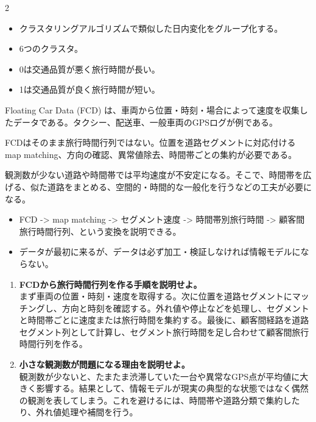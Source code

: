 \clearpage
{}
\begin{multicols}{2}\footnotesize\raggedcolumns
{}
\begin{itemize}
\item クラスタリングアルゴリズムで類似した日内変化をグループ化する。
\item 6つのクラスタ。
\item 0は交通品質が悪く旅行時間が長い。
\item 1は交通品質が良く旅行時間が短い。
\end{itemize}
Floating Car Data (FCD) は、車両から位置・時刻・場合によって速度を収集したデータである。タクシー、配送車、一般車両のGPSログが例である。\par

FCDはそのまま旅行時間行列ではない。位置を道路セグメントに対応付ける map matching、方向の確認、異常値除去、時間帯ごとの集約が必要である。\par

観測数が少ない道路や時間帯では平均速度が不安定になる。そこで、時間帯を広げる、似た道路をまとめる、空間的・時間的な一般化を行うなどの工夫が必要になる。\par
{}
\begin{itemize}
\item FCD -> map matching -> セグメント速度 -> 時間帯別旅行時間 -> 顧客間旅行時間行列、という変換を説明できる。
\item データが最初に来るが、データは必ず加工・検証しなければ情報モデルにならない。
\end{itemize}
\begin{enumerate}
\item \textbf{FCDから旅行時間行列を作る手順を説明せよ。}\\まず車両の位置・時刻・速度を取得する。次に位置を道路セグメントにマッチングし、方向と時刻を確認する。外れ値や停止などを処理し、セグメントと時間帯ごとに速度または旅行時間を集約する。最後に、顧客間経路を道路セグメント列として計算し、セグメント旅行時間を足し合わせて顧客間旅行時間行列を作る。
\item \textbf{小さな観測数が問題になる理由を説明せよ。}\\観測数が少ないと、たまたま渋滞していた一台や異常なGPS点が平均値に大きく影響する。結果として、情報モデルが現実の典型的な状態ではなく偶然の観測を表してしまう。これを避けるには、時間帯や道路分類で集約したり、外れ値処理や補間を行う。
\end{enumerate}
\end{multicols}

